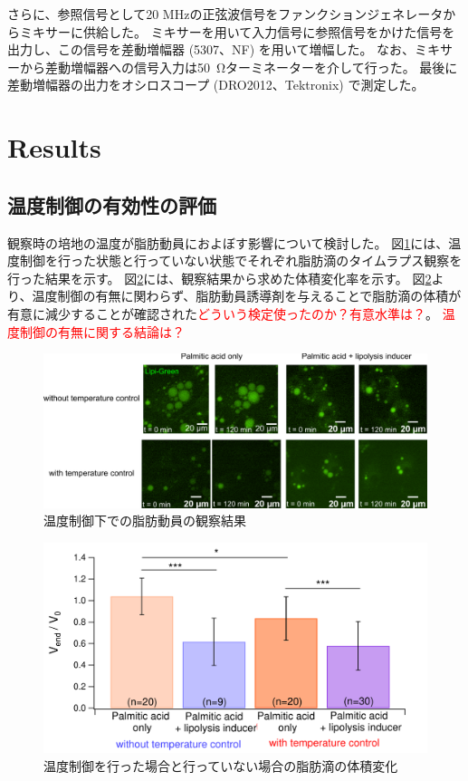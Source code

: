 \documentclass[uplatex,a4paper]{jsarticle}
\begin{document}
さらに、参照信号として20 MHzの正弦波信号をファンクションジェネレータからミキサーに供給した。
ミキサーを用いて入力信号に参照信号をかけた信号を出力し、この信号を差動増幅器 (5307、NF) を用いて増幅した。
なお、ミキサーから差動増幅器への信号入力は\SI{50}{\ohm}ターミネーターを介して行った。
最後に差動増幅器の出力をオシロスコープ (DRO2012、Tektronix) で測定した。

\section{Results}
\subsection{温度制御の有効性の評価}
観察時の培地の温度が脂肪動員におよぼす影響について検討した。
図\ref{fig:Lipolysis_TC}には、温度制御を行った状態と行っていない状態でそれぞれ脂肪滴のタイムラプス観察を行った結果を示す。
図\ref{fig:dV_TC}には、観察結果から求めた体積変化率を示す。
図\ref{fig:dV_TC}より、温度制御の有無に関わらず、脂肪動員誘導剤を与えることで脂肪滴の体積が有意に減少することが確認された\textcolor{red}{どういう検定使ったのか？有意水準は？}。
\textcolor{red}{温度制御の有無に関する結論は？}

\begin{figure}[H]
	\centering
	\includegraphics[width=15cm]{figure/3_1_Lipolysis_WvsWOTempCont.pdf}
	\caption{温度制御下での脂肪動員の観察結果	\label{fig:Lipolysis_TC}}
\end{figure}

\begin{figure}[H]
	\centering
	\includegraphics[width=15cm]{figure/3_2_dV_TempCont.pdf}
	\caption{温度制御を行った場合と行っていない場合の脂肪滴の体積変化	\label{fig:dV_TC}}
\end{figure}
\end{document}
